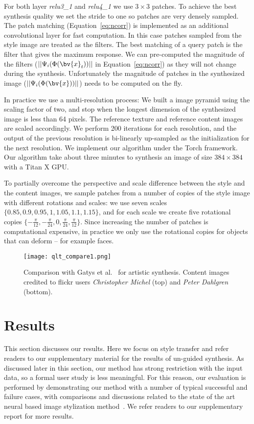 \documentclass[10pt,twocolumn,letterpaper]{article}
\begin{document}
For both layer \textit{relu3\_1} and \textit{relu4\_1} we use $3 \times 3$ patches. To achieve the best synthesis quality we set the stride to one so patches are very densely sampled. The patch matching (Equation~\ref{eq:ncorr}) is implemented as an additional convolutional layer for fast computation. In this case patches sampled from the style image are treated as the filters. The best matching of a query patch is the filter that gives the maximum response. We can pre-computed the magnitude of the filters ($||\Psi_i(\Phi(\bv{x}_{t}))||$ in Equation~\ref{eq:ncorr}) as they will not change during the synthesis. Unfortunately the magnitude of patches in the synthesized image ($||\Psi_i(\Phi(\bv{x}))||$) needs to be computed on the fly.

In practice we use a multi-resolution process: We built a image pyramid using the scaling factor of two, and stop when the longest dimension of the synthesized image is less than 64 pixels. The reference texture and reference content images are scaled accordingly. We perform 200 iterations for each resolution, and the output of the previous resolution is bi-linearly up-sampled as the initialization for the next resolution. We implement our algorithm under the Torch framework. Our algorithm take about three minutes to synthesis an image of size $384 \times 384$ with a Titan X GPU. 

To partially overcome the perspective and scale difference between the style and the content images, we sample patches from a number of copies of the style image with different rotations and scales: we use seven scales $\{0.85, 0.9, 0.95, 1, 1.05, 1.1, 1.15\}$, and for each scale we create five rotational copies $\{-\frac{\pi}{12}, -\frac{\pi}{24}, 0, \frac{\pi}{24}, \frac{\pi}{12}\}$. Since increasing the number of patches is computational expensive, in practice we only use the rotational copies for objects that can deform -- for example faces.

\begin{figure}[t]
	\centering
	\texttt{[image: qlt\_compare1.png]}
	\caption{Comparison with Gatys et al.~\cite{Gatys15} for artistic synthesis. Content images credited to flickr users \emph{Christopher Michel} (top) and \emph{Peter Dahlgren} (bottom).}\label{fig:qlt_compare1}
\end{figure}

\section{Results}
This section discusses our results. Here we focus on style transfer and refer readers to our supplementary material for the results of un-guided synthesis. As discussed later in this section, our method has strong restriction with the input data, so a formal user study is less meaningful. For this reason, our evaluation is performed by demonstrating our method with a number of typical successful and failure cases, with comparisons and discussions related to the state of the art neural based image stylization method~\cite{Gatys15}. We refer readers to our supplementary report for more results.
\end{document}
